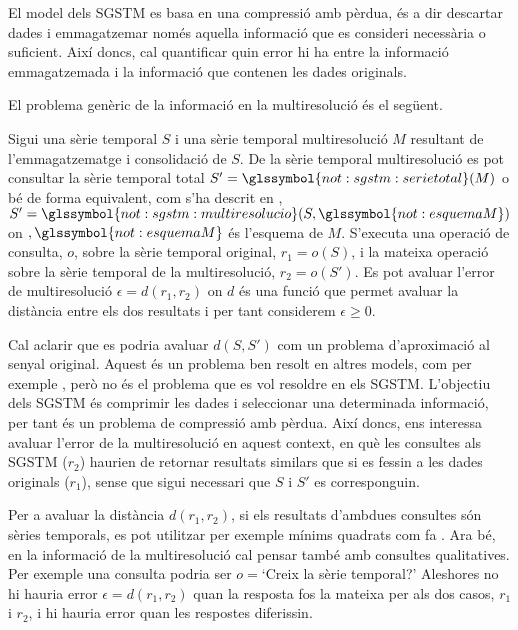 El model dels \gls{SGSTM} es basa en una compressió amb pèrdua, és a
dir descartar dades i emmagatzemar només aquella informació que es
consideri necessària o suficient. Així doncs, cal quantificar quin
error hi ha entre la informació emmagatzemada i la informació que
contenen les dades originals.


El problema genèric de la informació en la multiresolució és el següent.
\begin{definition}
  \label{def:informacio:error}
  Sigui una sèrie temporal $S$ i una sèrie temporal multiresolució $M$
  resultant de l'emmagatzematge i consolidació de $S$. De la sèrie
  temporal multiresolució es pot consultar la sèrie temporal total
  $S'=\glssymbol{not:sgstm:serietotal}(M)$ o bé de forma equivalent,
  com s'ha descrit en ,
  $S'=\glssymbol{not:sgstm:multiresolucio}(S,\glssymbol{not:esquemaM})$
  on $,\glssymbol{not:esquemaM}$ és l'esquema de $M$.  S'executa una
  operació de consulta, $o$, sobre la sèrie temporal original,
  $r_1=o(S)$, i la mateixa operació sobre la sèrie temporal de la
  multiresolució, $r_2=o(S')$. Es pot avaluar l'error de
  multiresolució $\epsilon=d(r_1,r_2)$ on $d$ és una funció que permet
  avaluar la distància entre els dos resultats i per tant considerem
  $\epsilon\geq 0$.
\end{definition}


Cal aclarir que es podria avaluar $d(S,S')$ com un problema
d'aproximació al senyal original. Aquest és un problema ben resolt en
altres models, com per exemple \textcite{last01,ogras06}, però no és
el problema que es vol resoldre en els \gls{SGSTM}.  L'objectiu dels
\gls{SGSTM} és comprimir les dades i seleccionar una determinada
informació, per tant és un problema de compressió amb pèrdua.  Així
doncs, ens interessa avaluar l'error de la multiresolució en aquest
context, en què les consultes als \gls{SGSTM} ($r_2$) haurien de
retornar resultats similars que si es fessin a les dades originals
($r_1$), sense que sigui necessari que $S$ i $S'$ es corresponguin.




Per a avaluar la distància $d(r_1,r_2)$, si els resultats d'ambdues
consultes són sèries temporals, es pot utilitzar per exemple mínims
quadrats com fa \textcite{last01}.  Ara bé, en la informació de la
multiresolució cal pensar també amb consultes qualitatives. Per
exemple una consulta podria ser $o=$`Creix la sèrie temporal?'
Aleshores no hi hauria error $\epsilon=d(r_1,r_2)$ quan la resposta
fos la mateixa per als dos casos, $r_1$ i $r_2$, i hi hauria error
quan les respostes diferissin.



